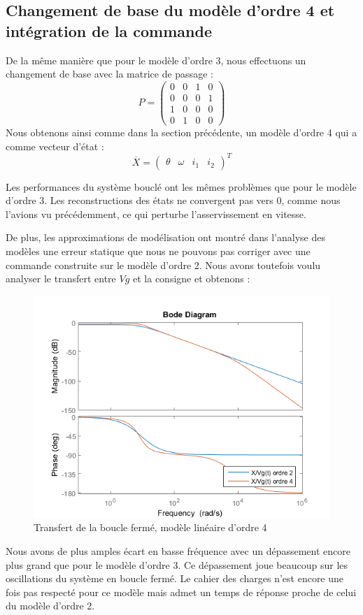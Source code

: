 \subsection{Changement de base du modèle d'ordre 4 et intégration de la commande\label{sub:observateurSurModelO4}}
De la même manière que pour le modèle d'ordre 3, nous effectuons un changement de base avec la matrice de passage : \begin{equation}
P = \begin{pmatrix}
0 &0& 1& 0\\ 0& 0& 0& 1\\1& 0& 0& 0\\ 0& 1& 0& 0
\end{pmatrix}
\end{equation}
Nous obtenons ainsi comme dans la section précédente, un modèle d'ordre 4 qui a comme vecteur d'état : 
\begin{equation}
\overline{X} = \begin{pmatrix}
\theta & \omega & i_1& i_2
\end{pmatrix}^T
\end{equation}

Les performances du système bouclé ont les mêmes problèmes que pour le modèle d'ordre 3. Les reconstructions des états ne convergent pas vers 0, comme nous l'avions vu précédemment, ce qui perturbe l'asservissement en vitesse.

De plus, les approximations de modélisation ont montré dans l'analyse des modèles une erreur statique que nous ne pouvons pas corriger avec une commande construite sur le modèle d'ordre 2. Nous avons toutefois voulu analyser le transfert entre $Vg$ et la consigne et obtenons :
\begin{figure}[ht]
\centering
\includegraphics[width = .5\textwidth]{./III/figure/bode_Tpert_EE0.png}
\caption{Transfert de la boucle fermé, modèle linéaire d'ordre 4}
\end{figure}
Nous avons de plus amples écart en basse fréquence avec un dépassement encore plus grand que pour le modèle d'ordre 3. Ce dépassement joue beaucoup sur les oscillations du système en boucle fermé. Le cahier des charges n'est encore une fois pas respecté pour ce modèle mais admet un temps de réponse proche de celui du modèle d'ordre 2.

